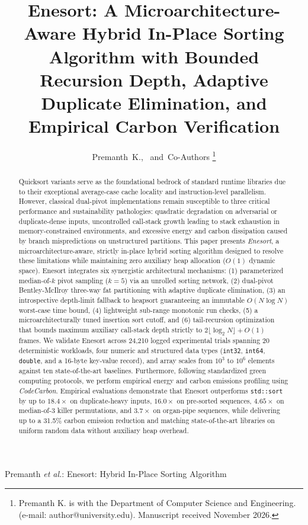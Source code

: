 \documentclass[journal]{IEEEtran}
\begin{document}
\title{Enesort: A Microarchitecture-Aware Hybrid In-Place Sorting Algorithm with Bounded Recursion Depth, Adaptive Duplicate Elimination, and Empirical Carbon Verification}

\author{Premanth~K.,~
        and~Co-Authors%
\thanks{Premanth K. is with the Department of Computer Science and Engineering. (e-mail: author@university.edu). Manuscript received November 2026.}}

%
{Premanth \MakeLowercase{\textit{et al.}}: Enesort: Hybrid In-Place Sorting Algorithm}

\maketitle

\begin{abstract}
Quicksort variants serve as the foundational bedrock of standard runtime libraries due to their exceptional average-case cache locality and instruction-level parallelism. However, classical dual-pivot implementations remain susceptible to three critical performance and sustainability pathologies: quadratic degradation on adversarial or duplicate-dense inputs, uncontrolled call-stack growth leading to stack exhaustion in memory-constrained environments, and excessive energy and carbon dissipation caused by branch mispredictions on unstructured partitions. This paper presents \textit{Enesort}, a microarchitecture-aware, strictly in-place hybrid sorting algorithm designed to resolve these limitations while maintaining zero auxiliary heap allocation ($O(1)$ dynamic space). Enesort integrates six synergistic architectural mechanisms: (1) parameterized median-of-$k$ pivot sampling ($k=5$) via an unrolled sorting network, (2) dual-pivot Bentley-McIlroy three-way fat partitioning with adaptive duplicate elimination, (3) an introspective depth-limit fallback to heapsort guaranteeing an immutable $O(N \log N)$ worst-case time bound, (4) lightweight sub-range monotonic run checks, (5) a microarchitecturally tuned insertion sort cutoff, and (6) tail-recursion optimization that bounds maximum auxiliary call-stack depth strictly to $2 \lfloor \log_2 N \rfloor + O(1)$ frames. 
We validate Enesort across 24,210 logged experimental trials spanning 20 deterministic workloads, four numeric and structured data types (\texttt{int32}, \texttt{int64}, \texttt{double}, and a 16-byte key-value record), and array scales from $10^3$ to $10^6$ elements against ten state-of-the-art baselines. Furthermore, following standardized green computing protocols, we perform empirical energy and carbon emissions profiling using \textit{CodeCarbon}. Empirical evaluations demonstrate that Enesort outperforms \texttt{std::sort} by up to $18.4\times$ on duplicate-heavy inputs, $16.0\times$ on pre-sorted sequences, $4.65\times$ on median-of-3 killer permutations, and $3.7\times$ on organ-pipe sequences, while delivering up to a 31.5\% carbon emission reduction and matching state-of-the-art libraries on uniform random data without auxiliary heap overhead.
\end{abstract}
\end{document}
